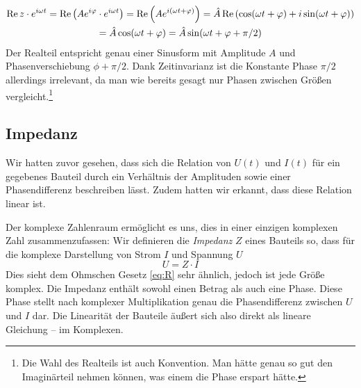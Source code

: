 \begin{gather*}
\Re z\cdot e^{i\omega t}
    = \Re\qty(Ae^{i\varphi} \cdot e^{i\omega t})
    = \Re\qty(Ae^{i(\omega t + \varphi)})
    = \hat A\Re\qty(\cos(\omega t + \varphi) + i\sin(\omega t + \varphi)) \\
    = \hat A\cos(\omega t  +\varphi)
    = \hat A\sin(\omega t + \varphi + \pi/2)
\end{gather*}
Der Realteil entspricht genau einer Sinusform mit Amplitude $A$ und Phasenverschiebung $\phi+\pi/2$. Dank Zeitinvarianz
ist die Konstante Phase $\pi/2$ allerdings irrelevant, da man wie bereits gesagt nur Phasen zwischen Größen
vergleicht.\footnote{Die Wahl des Realteils ist auch Konvention. Man hätte genau so gut den Imaginärteil nehmen können,
was einem die Phase erspart hätte.}
\subsection{Impedanz}
Wir hatten zuvor gesehen, dass sich die Relation von $U(t)$ und $I(t)$ für ein gegebenes Bauteil durch ein Verhältnis
der Amplituden sowie einer Phasendifferenz beschreiben lässt. Zudem hatten wir erkannt, dass diese Relation linear ist.

Der komplexe Zahlenraum ermöglicht es uns, dies in einer einzigen komplexen Zahl zusammenzufassen: Wir definieren die
\emph{Impedanz} $Z$ eines Bauteils so, dass für die komplexe Darstellung von Strom $I$ und Spannung $U$
\begin{equation}\label{eq:impedanz}
    U = Z \cdot I
\end{equation}
Dies sieht dem Ohmschen Gesetz \eqref{eq:R} sehr ähnlich, jedoch ist jede Größe komplex. Die Impedanz enthält sowohl
einen Betrag als auch eine Phase. Diese Phase stellt nach komplexer Multiplikation genau die Phasendifferenz zwischen
$U$ und $I$ dar. Die Linearität der Bauteile äußert sich also direkt als lineare Gleichung -- im Komplexen.

